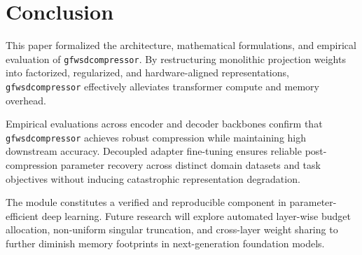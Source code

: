 \section{Conclusion}
This paper formalized the architecture, mathematical formulations, and empirical evaluation of \texttt{gfwsdcompressor}. By restructuring monolithic projection weights into factorized, regularized, and hardware-aligned representations, \texttt{gfwsdcompressor} effectively alleviates transformer compute and memory overhead.

Empirical evaluations across encoder and decoder backbones confirm that \texttt{gfwsdcompressor} achieves robust compression while maintaining high downstream accuracy. Decoupled adapter fine-tuning ensures reliable post-compression parameter recovery across distinct domain datasets and task objectives without inducing catastrophic representation degradation.

The module constitutes a verified and reproducible component in parameter-efficient deep learning. Future research will explore automated layer-wise budget allocation, non-uniform singular truncation, and cross-layer weight sharing to further diminish memory footprints in next-generation foundation models.

